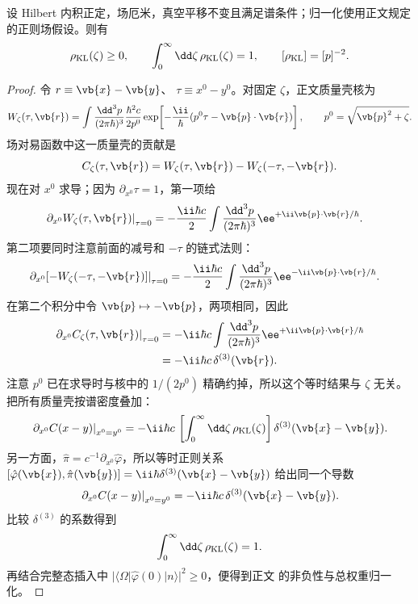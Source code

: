 \begin{proposition}[谱测度的正性与归一化]
设 Hilbert 内积正定，场厄米，真空平移不变且满足谱条件；归一化使用正文规定的正则场假设。则有
\begin{equation}
 {
 \rho_{\rm KL}(\zeta)\ge0,
 \qquad
 \int_0^\infty\dd\zeta\,\rho_{\rm KL}(\zeta)=1,
 \qquad [\rho_{\rm KL}]=[p]^{-2}.}
\label{eq:KL-positive-normalization-r16}
\end{equation}
\end{proposition}
\begin{proof}
令 $r\equiv\vb{x}-\vb{y}$、
$\tau\equiv x^0-y^0$。对固定 $\zeta$，正文质量壳核为
\begin{equation*}
 W_\zeta(\tau,\vb{r})
 =\int\frac{\dd^3p}{(2\pi\hbar)^3}
 \frac{\hbar^2c}{2p^0}
 \exp\!\left[-\frac{\ii}{\hbar}
 (p^0\tau-\vb{p}\cdot\vb{r})\right],
 \qquad p^0=\sqrt{\vb{p}^2+\zeta}.
\end{equation*}
场对易函数中这一质量壳的贡献是
\[
 C_\zeta(\tau,\vb{r})
 =W_\zeta(\tau,\vb{r})-W_\zeta(-\tau,-\vb{r}).
\]
现在对 $x^0$ 求导；因为 $\partial_{x^0}\tau=1$，第一项给
\begin{align*}
 \left.\partial_{x^0}W_\zeta(\tau,\vb{r})\right|_{\tau=0}
 &=-\frac{\ii\hbar c}{2}
 \int\frac{\dd^3p}{(2\pi\hbar)^3}
 \ee^{+\ii\vb{p}\cdot\vb{r}/\hbar}.
\end{align*}
第二项要同时注意前面的减号和 $-\tau$ 的链式法则：
\begin{align*}
 \left.\partial_{x^0}[-W_\zeta(-\tau,-\vb{r})]\right|_{\tau=0}
 &=-\frac{\ii\hbar c}{2}
 \int\frac{\dd^3p}{(2\pi\hbar)^3}
 \ee^{-\ii\vb{p}\cdot\vb{r}/\hbar}.
\end{align*}
在第二个积分中令 $\vb{p}\mapsto-\vb{p}$，两项相同，因此
\begin{align*}
 \left.\partial_{x^0}C_\zeta(\tau,\vb{r})\right|_{\tau=0}
 &=-\ii\hbar c
 \int\frac{\dd^3p}{(2\pi\hbar)^3}
 \ee^{+\ii\vb{p}\cdot\vb{r}/\hbar}\\
 &=-\ii\hbar c\,\delta^{(3)}(\vb{r}).
\end{align*}
注意 $p^0$ 已在求导时与核中的 $1/(2p^0)$ 精确约掉，所以这个等时结果与 $\zeta$ 无关。把所有质量壳按谱密度叠加：
\begin{align*}
 \left.\partial_{x^0}C(x-y)\right|_{x^0=y^0}
 =-\ii\hbar c\,
 \left[\int_0^\infty\dd\zeta\,\rho_{\rm KL}(\zeta)\right]
 \delta^{(3)}(\vb{x}-\vb{y}).
\end{align*}
另一方面，$\hat\pi=c^{-1}\partial_{x^0}\hat\varphi$，所以等时正则关系
$[\hat\varphi(\vb{x}),\hat\pi(\vb{y})]=\ii\hbar\delta^{(3)}(\vb{x}-\vb{y})$
给出同一个导数
\[
 \left.\partial_{x^0}C(x-y)\right|_{x^0=y^0}
 =-\ii\hbar c\,\delta^{(3)}(\vb{x}-\vb{y}).
\]
比较 $\delta^{(3)}$ 的系数得到
\[
 \int_0^\infty\dd\zeta\,\rho_{\rm KL}(\zeta)=1.
\]
再结合完整态插入中
$|\langle\Omega|\hat\varphi(0)|n\rangle|^2\ge0$，便得到正文
 的非负性与总权重归一化。
\end{proof}

